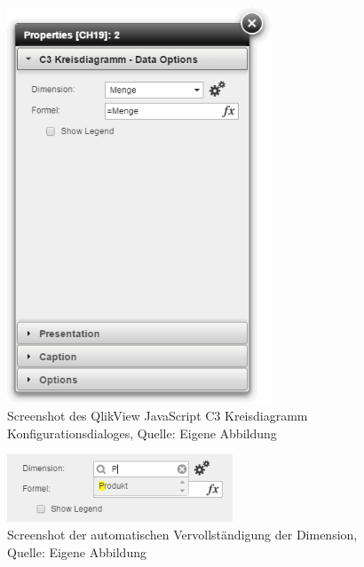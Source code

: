 \begin{appendix}
\ifIncludeFigures\begin{figure}[htbp]
	\centering
		\includegraphics[width=0.70\textwidth]{img/QvPropDialog/C3KreisdiagrammDialog.png}
	\caption[QlikView JavaScript C3 Kreisdiagramm Konfigurationsdialog]{Screenshot des QlikView JavaScript C3 Kreisdiagramm Konfigurationsdialoges, Quelle: Eigene Abbildung}
	\label{fig:QlikViewC3KreisdiagrammDialogScreenshot}
\end{figure}\fi




\ifIncludeFigures\begin{figure}[htbp]
	\centering
		\includegraphics[width=0.60\textwidth]{img/QvPropDialog/DimensionAutomatischeVervollstaendigung.png}
		\caption[Automatischen Vervollständigung der Dimension]{Screenshot der automatischen Vervollständigung der Dimension, \\Quelle: Eigene Abbildung}
	\label{fig:DimensionAutomatischeVervollstaendigung}
\end{figure}\fi




\end{appendix}
